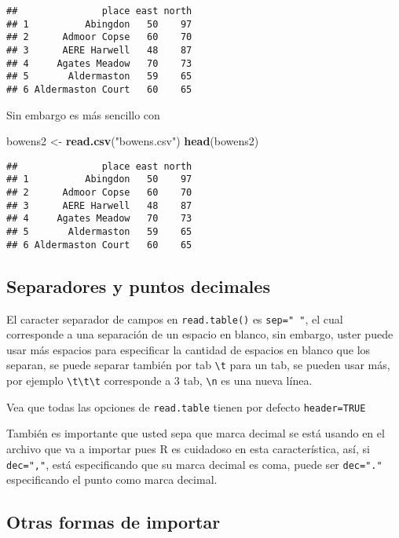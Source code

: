\documentclass[]{article}
\newenvironment{Shaded}{\begin{snugshade}}{\end{snugshade}}
\newcommand{\KeywordTok}[1]{\textcolor[rgb]{0.13,0.29,0.53}{\textbf{#1}}}
\newcommand{\StringTok}[1]{\textcolor[rgb]{0.31,0.60,0.02}{#1}}
\newcommand{\NormalTok}[1]{#1}
\begin{document}
\begin{verbatim}
##               place east north
## 1          Abingdon   50    97
## 2      Admoor Copse   60    70
## 3      AERE Harwell   48    87
## 4     Agates Meadow   70    73
## 5       Aldermaston   59    65
## 6 Aldermaston Court   60    65
\end{verbatim}

Sin embargo es más sencillo con

\begin{Shaded}
\begin{Highlighting}[]
\NormalTok{bowens2 <-}\StringTok{ }\KeywordTok{read.csv}\NormalTok{(}\StringTok{"bowens.csv"}\NormalTok{)}
\KeywordTok{head}\NormalTok{(bowens2)}
\end{Highlighting}
\end{Shaded}

\begin{verbatim}
##               place east north
## 1          Abingdon   50    97
## 2      Admoor Copse   60    70
## 3      AERE Harwell   48    87
## 4     Agates Meadow   70    73
## 5       Aldermaston   59    65
## 6 Aldermaston Court   60    65
\end{verbatim}

\subsection{Separadores y puntos
decimales}\label{separadores-y-puntos-decimales}

El caracter separador de campos en \texttt{read.table()} es
\texttt{sep="\ "}, el cual corresponde a una separación de un espacio en
blanco, sin embargo, uster puede usar más espacios para especificar la
cantidad de espacios en blanco que los separan, se puede separar también
por tab \texttt{\textbackslash{}t} para un tab, se pueden usar más, por
ejemplo \texttt{\textbackslash{}t\textbackslash{}t\textbackslash{}t}
corresponde a 3 tab, \texttt{\textbackslash{}n} es una nueva línea.

Vea que todas las opciones de \texttt{read.table} tienen por defecto
\texttt{header=TRUE}

También es importante que usted sepa que marca decimal se está usando en
el archivo que va a importar pues R es cuidadoso en esta característica,
así, si \texttt{dec=","}, está especificando que su marca decimal es
coma, puede ser \texttt{dec="."} especificando el punto como marca
decimal.

\subsection{Otras formas de importar}\label{otras-formas-de-importar}
\end{document}
